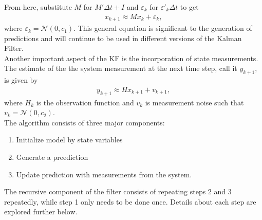 \noindent From here, substitute $M$ for $M' \Delta t + I$ and $\varepsilon_k$ for  $\varepsilon '_k  \Delta t $ to get
\begin{align*}
	x_{k+1} \approx M x_k + \varepsilon_k,
\end{align*}
\noindent where $\varepsilon_k = \mathcal{N}(0, c_1)$. This general equation is significant to the generation of predictions and will continue to be used in different versions of the Kalman Filter. \\ 

\noindent Another important aspect of the KF is the incorporation of state measurements. The estimate of the the system measurement at the next time step, call it $y_{k+1}$, is given by 
\begin{align*}
	y_{k+1} \approx H x_{k+1} + v_{k+1},
\end{align*}
where $H_k$ is the observation function and $v_k$ is measurement noise such that $v_k = \mathcal{N}(0, c_2)$. \\

\noindent The algorithm consists of three major components:
\begin{enumerate}
  \item Initialize model by state variables
  \item Generate a preediction
  \item Update prediction with measurements from the system.
\end{enumerate}
The recursive component of the filter consists of repeating steps 2 and 3 repeatedly, while step 1 only needs to be done once. Details about each step are explored further below.


